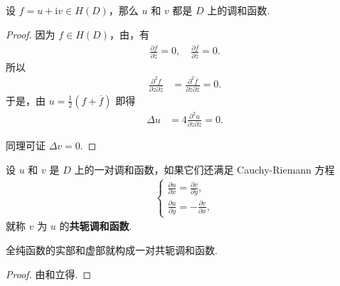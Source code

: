 \documentclass[../../main.tex]{subfiles}%
\begin{document}
\begin{theorem}\label{theorem:全纯函数的实部和虚部都是调和函数}
设 $f = u + \mathrm{i}v \in H(D)$，那么 $u$ 和 $v$ 都是 $D$ 上的调和函数.
\end{theorem}
\begin{proof}

因为 $f \in H(D)$，由，有
\begin{align*}
\frac{\partial f}{\partial \overline{z}} = 0, \quad
\frac{\partial \overline{f}}{\partial z} = 0.
\end{align*}
所以
\begin{align*}
\frac{\partial^2 f}{\partial z \partial \overline{z}} &= \frac{\partial^2 \overline{f}}{\partial z \partial \overline{z}} = 0.
\end{align*}
于是，由 $u = \frac{1}{2}(f + \overline{f})$ 即得
\begin{align*}
\Delta u &= 4 \frac{\partial^2 u}{\partial z \partial \overline{z}} = 0.
\end{align*}

同理可证 $\Delta v = 0$.

\end{proof}

\begin{definition}[共轭调和函数]
设 $u$ 和 $v$ 是 $D$ 上的一对调和函数，如果它们还满足 Cauchy-Riemann 方程
\begin{align}
\begin{cases} 
\displaystyle \frac{\partial u}{\partial x} = \frac{\partial v}{\partial y}, \\
\displaystyle \frac{\partial u}{\partial y} = -\frac{\partial v}{\partial x},
\end{cases} \label{eq:2.2.10}
\end{align}
就称 $v$ 为 $u$ 的\textbf{共轭调和函数}.
\end{definition}

\begin{proposition}
全纯函数的实部和虚部就构成一对共轭调和函数.
\end{proposition}
\begin{proof}

由和立得.

\end{proof}
\end{document}
